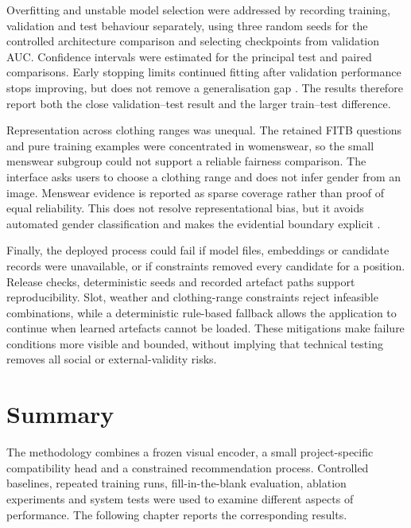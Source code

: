 Overfitting and unstable model selection were addressed by recording training,
validation and test behaviour separately, using three random seeds for the
controlled architecture comparison and selecting checkpoints from validation
AUC. Confidence intervals were estimated for the principal test and paired
comparisons. Early stopping limits continued fitting after validation
performance stops improving, but does not remove a generalisation gap
\parencite{prechelt1998early}. The results therefore report both the close
validation--test result and the larger train--test difference.

Representation across clothing ranges was unequal. The retained FITB questions
and pure training examples were concentrated in womenswear, so the small
menswear subgroup could not support a reliable fairness comparison. The
interface asks users to choose a clothing range and does not infer gender from
an image. Menswear evidence is reported as sparse coverage rather than proof of
equal reliability. This does not resolve representational bias, but it avoids
automated gender classification and makes the evidential boundary explicit
\parencite{keyes2018misgendering,mehrabi2021bias}.

Finally, the deployed process could fail if model files, embeddings or
candidate records were unavailable, or if constraints removed every candidate
for a position. Release checks, deterministic seeds and recorded artefact paths
support reproducibility. Slot, weather and clothing-range constraints reject
infeasible combinations, while a deterministic rule-based fallback allows the
application to continue when learned artefacts cannot be loaded. These mitigations make failure conditions more
visible and bounded, without implying that technical testing removes all
social or external-validity risks.

\section{Summary}

The methodology combines a frozen visual encoder, a small project-specific
compatibility head and a constrained recommendation process. Controlled baselines, repeated
training runs, fill-in-the-blank evaluation, ablation experiments and system
tests were used to examine different aspects of performance. The following
chapter reports the corresponding results.
